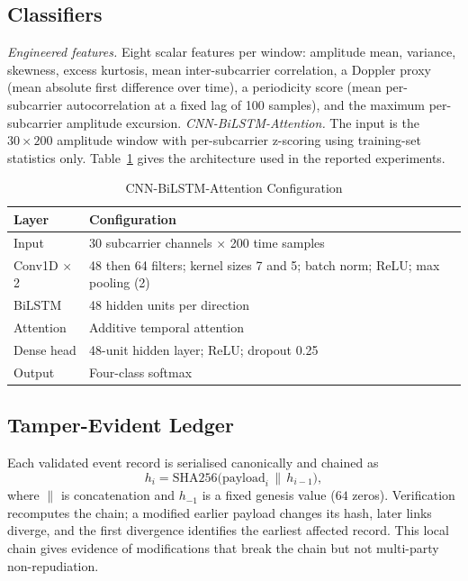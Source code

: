 \documentclass[conference]{IEEEtran}
\begin{document}
\subsection{Classifiers}
\emph{Engineered features.} Eight scalar features per window: amplitude mean, variance, skewness, excess kurtosis, mean inter-subcarrier correlation, a Doppler proxy (mean absolute first difference over time), a periodicity score (mean per-subcarrier autocorrelation at a fixed lag of 100 samples), and the maximum per-subcarrier amplitude excursion. \emph{CNN-BiLSTM-Attention.} The input is the $30\times200$ amplitude window with per-subcarrier z-scoring using training-set statistics only. Table~\ref{tab:cnn} gives the architecture used in the reported experiments.

\begin{table}[t]
\caption{CNN-BiLSTM-Attention Configuration}
\label{tab:cnn}
\centering
\small
\begin{tabular}{p{1.6cm}p{5.4cm}}
\toprule
Layer & Configuration \\
\midrule
Input & 30 subcarrier channels $\times$ 200 time samples \\
Conv1D $\times$2 & 48 then 64 filters; kernel sizes 7 and 5; batch norm; ReLU; max pooling (2) \\
BiLSTM & 48 hidden units per direction \\
Attention & Additive temporal attention \\
Dense head & 48-unit hidden layer; ReLU; dropout 0.25 \\
Output & Four-class softmax \\
\bottomrule
\end{tabular}
\end{table}

\subsection{Tamper-Evident Ledger}
Each validated event record is serialised canonically and chained as
\begin{equation}
h_i=\mathrm{SHA256}\big(\mathrm{payload}_i \,\|\, h_{i-1}\big),
\label{eq:hash}
\end{equation}
where $\|$ is concatenation and $h_{-1}$ is a fixed genesis value ($64$ zeros). Verification recomputes the chain; a modified earlier payload changes its hash, later links diverge, and the first divergence identifies the earliest affected record. This local chain gives evidence of modifications that break the chain but not multi-party non-repudiation.
\end{document}
